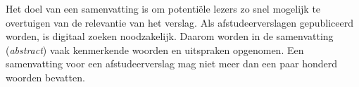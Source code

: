 \samenvatting

Het doel van een samenvatting is om potentiële lezers zo snel mogelijk
te overtuigen van de relevantie van het verslag. Als afstudeerverslagen
gepubliceerd worden, is digitaal zoeken noodzakelijk. Daarom worden in
de samenvatting (\emph{abstract}) vaak kenmerkende woorden en
uitspraken opgenomen. Een samenvatting voor een afstudeerverslag mag
niet meer dan een paar honderd woorden bevatten.
